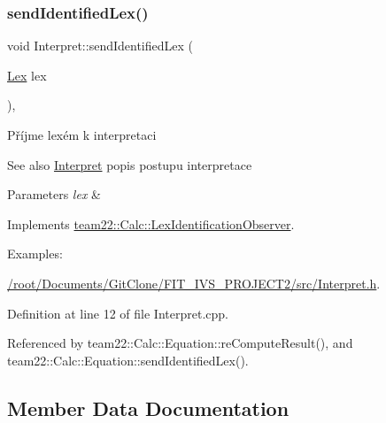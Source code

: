 \subsubsection{\texorpdfstring{send\+Identified\+Lex()}{sendIdentifiedLex()}}
{\footnotesize\ttfamily void Interpret\+::send\+Identified\+Lex (\begin{DoxyParamCaption}\item[{\hyperlink{classteam22_1_1_calc_1_1_lex}{Lex}}]{lex }\end{DoxyParamCaption})\hspace{0.3cm}{\ttfamily [override]}, {\ttfamily [virtual]}}

Příjme lexém k interpretaci \begin{DoxySeeAlso}{See also}
\hyperlink{classteam22_1_1_calc_1_1_interpret}{Interpret} popis postupu interpretace 
\end{DoxySeeAlso}

\begin{DoxyParams}{Parameters}
{\em lex} & \\
\hline
\end{DoxyParams}


Implements \hyperlink{classteam22_1_1_calc_1_1_lex_identification_observer_ac139f75c560625ec6fdb2e34cf0d4884}{team22\+::\+Calc\+::\+Lex\+Identification\+Observer}.

\begin{Desc}
\item[Examples\+: ]\par
\hyperlink{_2root_2_documents_2_git_clone_2_f_i_t__i_v_s__p_r_o_j_e_c_t2_2src_2_interpret_8h-example}{/root/\+Documents/\+Git\+Clone/\+F\+I\+T\+\_\+\+I\+V\+S\+\_\+\+P\+R\+O\+J\+E\+C\+T2/src/\+Interpret.\+h}.\end{Desc}


Definition at line 12 of file Interpret.\+cpp.



Referenced by team22\+::\+Calc\+::\+Equation\+::re\+Compute\+Result(), and team22\+::\+Calc\+::\+Equation\+::send\+Identified\+Lex().



\subsection{Member Data Documentation}
\mbox{\label{classteam22_1_1_calc_1_1_interpret_a7db1e80a4733124ed425e62a90f9eadb}} 
